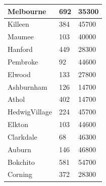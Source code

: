 \documentclass[titlepage]{article}
\begin{document}
\begin{table}[!ht]
\begin{tabular}{|l|l|l|}
        Melbourne & 692 & 35300 \\ \hline
        Killeen & 384 & 45700 \\ \hline
        Maumee & 103 & 40000 \\ \hline
        Hanford & 449 & 28300 \\ \hline
        Pembroke & 92 & 44600 \\ \hline
        Elwood & 133 & 27800 \\ \hline
        Ashburnham & 126 & 14700 \\ \hline
        Athol & 402 & 14700 \\ \hline
        HedwigVillage & 224 & 45700 \\ \hline
        Elkton & 103 & 44600 \\ \hline
        Clarkdale & 68 & 46300 \\ \hline
        Auburn & 146 & 46800 \\ \hline
        Bokchito & 581 & 54700 \\ \hline
        Corning & 372 & 28300 \\ \hline
    \end{tabular}
\end{table}
\end{document}

